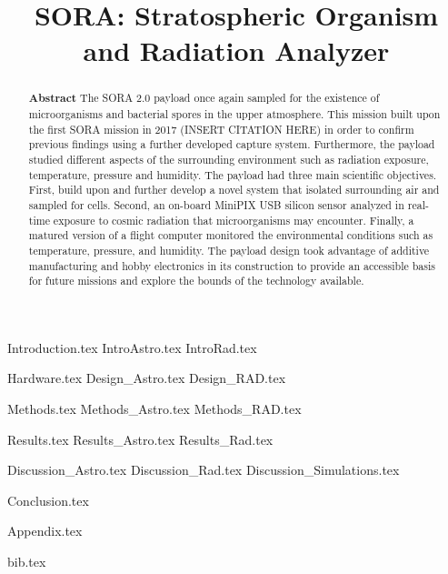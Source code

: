\documentclass[aps,superscriptaddress,floatfix,nofootinbib,showpacs,amsmath,amssymb,altaffilletter,floatfix,onecolumn]{revtex4-1}
\begin{document}
\title{SORA: Stratospheric Organism and Radiation Analyzer}

\begin{abstract}
\begin{center}
{\bf Abstract}
The SORA 2.0 payload once again sampled for the existence of microorganisms and bacterial spores in the upper atmosphere.  This mission built upon the first SORA mission in 2017 (INSERT CITATION HERE) in order to confirm previous findings using a further developed capture system.  Furthermore, the payload studied different aspects of the surrounding environment such as radiation exposure, temperature, pressure and humidity. The payload had three main scientific objectives. First, build upon and further develop a novel system that isolated surrounding air and sampled for cells.  Second, an on-board MiniPIX USB silicon sensor analyzed in real-time exposure to cosmic radiation that microorganisms may encounter.  Finally, a matured version of a flight computer monitored the environmental conditions such as temperature, pressure, and humidity.  The payload design took advantage of additive manufacturing and hobby electronics in its construction to provide an accessible basis for future missions and explore the bounds of the technology available. 

\end{center}
\newpage %
\end{abstract}

\setlength{\parindent}{1em}
\setdefaultleftmargin{1em}{1em}{}{}{}{}
\setcounter{page}{0}\thispagestyle{empty}
\maketitle
\onecolumngrid
\setcounter{tocdepth}{2}
\setcounter{page}{0}\thispagestyle{empty}
\tableofcontents
\setcounter{page}{0}\thispagestyle{empty}
\newpage
\onecolumngrid

{Introduction.tex}
{IntroAstro.tex}
{IntroRad.tex}

{Hardware.tex}
{Design_Astro.tex}
{Design_RAD.tex}

{Methods.tex}
{Methods_Astro.tex}
{Methods_RAD.tex}

{Results.tex} 
{Results_Astro.tex} 
{Results_Rad.tex} 


{Discussion_Astro.tex}
{Discussion_Rad.tex}
{Discussion_Simulations.tex}

{Conclusion.tex} 
\newpage

{Appendix.tex}
\newpage

{bib.tex}%

\clearpage

\end{document}
